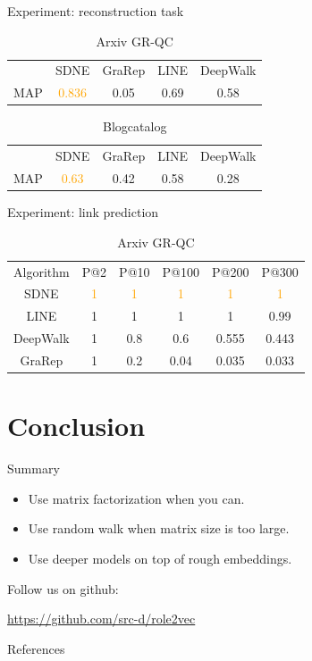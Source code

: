 \documentclass[10pt,aspectratio=169]{beamer}
\begin{document}
\begin{frame}[fragile]{Experiment: reconstruction task}
  \begin{table}
    \caption*{Arxiv GR-QC \cite{wang2016structural}}
    \begin{tabular}{ccccc}
      \hfill & SDNE & GraRep & LINE & DeepWalk\\
      MAP & \textcolor{orange}{0.836} & 0.05 & 0.69 & 0.58
    \end{tabular}
  \end{table}

  \begin{table}
    \caption*{Blogcatalog \cite{wang2016structural}}
    \begin{tabular}{ccccc}
      \hfill & SDNE & GraRep & LINE & DeepWalk\\
      MAP & \textcolor{orange}{0.63} & 0.42 & 0.58 & 0.28
    \end{tabular}
  \end{table}
\end{frame}

\begin{frame}[fragile]{Experiment: link prediction}
  \begin{table}
    \caption*{Arxiv GR-QC \cite{wang2016structural}}
    \begin{tabular}{cccccc}
      Algorithm & P@2 & P@10 & P@100 & P@200 & P@300\\
      SDNE & \textcolor{orange}{1} & \textcolor{orange}{1} & \textcolor{orange}{1} & \textcolor{orange}{1} & \textcolor{orange}{1}\\
      LINE & 1 & 1 & 1 & 1 & 0.99\\
      DeepWalk & 1 & 0.8 & 0.6 & 0.555 & 0.443\\
      GraRep & 1 & 0.2 & 0.04 & 0.035 & 0.033
    \end{tabular}
  \end{table}
\end{frame}


\section{Conclusion}

\begin{frame}{Summary}
  \begin{itemize}
    \pause
    \item Use matrix factorization when you can.
    \pause
    \item Use random walk when matrix size is too large.
    \pause
    \item Use deeper models on top of rough embeddings.
  \end{itemize}
  \vspace{2mm}
  \pause
  Follow us on github:
  \begin{center}\url{https://github.com/src-d/role2vec}\end{center}
\end{frame}

\appendix

\begin{frame}[allowframebreaks]{References}

  
  

\end{frame}
\end{document}
